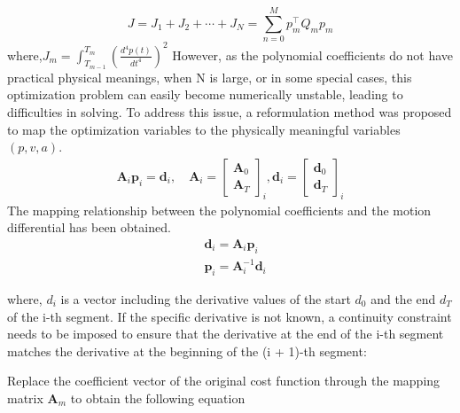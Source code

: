 \documentclass[conference]{IEEEtran}
\begin{document}
    \begin{equation}
        J= J_{1}+J_{2}+\cdots+J_{N} = \sum_{n=0}^M p_{m}^\top Q_{m}p_{m}
    \end{equation}
    where,$J_{m} = \int^{T_{m}}_{{T_{m-1}}}\left( \frac{d^4p(t)}{dt^4} \right)^2$
    However, as the polynomial coefficients do not have practical physical meanings, when N is large, or in some special cases, this optimization problem can easily become numerically unstable, leading to difficulties in solving. To address this issue, a reformulation method was proposed to map the optimization variables to the physically meaningful variables $(p,v,a)$.
    \begin{equation}
        \begin{aligned}
            \boldsymbol{A}_i\boldsymbol{p}_i=\boldsymbol{d}_i,\quad \boldsymbol{A}_i=\begin{bmatrix}\boldsymbol{A}_0\\\boldsymbol{A}_T\end{bmatrix}_i,\boldsymbol{d}_i=\begin{bmatrix}\boldsymbol{d}_0\\\boldsymbol{d}_T\end{bmatrix}_i
        \end{aligned}
    \end{equation}
    The mapping relationship between the polynomial coefficients and the motion differential has been obtained.
    \begin{equation}
        \begin{aligned}
            & \boldsymbol{d}_{i}
            = 
            \boldsymbol{A}_{i} 
            \boldsymbol{p}_{i} \\
            & \boldsymbol{p}_{i} = \boldsymbol{A}_{i}^{-1}\boldsymbol{d}_{i}
        \end{aligned}
    \end{equation}

    where, $d_{i}$ is a vector including the derivative values of the start $d_0$ and the end $d_T$ of the i-th segment. If the specific derivative is not known, a continuity constraint needs to be imposed to ensure that the derivative at the end of the i-th segment matches the derivative at the beginning of the (i + 1)-th segment: 

    Replace the coefficient vector of the original cost function through the mapping matrix $\boldsymbol{A}_{m}$ to obtain the following equation
\end{document}

